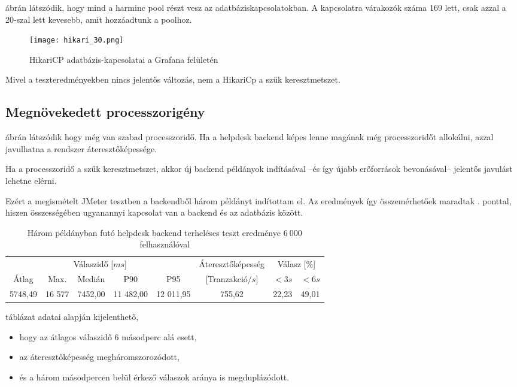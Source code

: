  ábrán látszódik, hogy mind a harminc pool részt vesz az adatbáziskapcsolatokban. A kapcsolatra várakozók száma 169 lett, csak azzal a 20-szal lett kevesebb, amit hozzáadtunk a poolhoz.


\begin{figure}[hbt] 
	\centering
	\texttt{[image: hikari\_30.png]}
	\caption{HikariCP adatbázis-kapcsolatai a Grafana felületén}
	\label{fig:hikari_30}
\end{figure}

Mivel a teszteredményekben nincs jelentős változás, nem a HikariCp a szűk keresztmetszet.

\pagebreak
\subsection{Megnövekedett processzorigény}
 ábrán látszódik hogy még van szabad processzoridő. Ha a helpdesk backend  képes lenne magának még processzoridőt allokálni, azzal javulhatna a rendszer áteresztőképessége. 

Ha a processzoridő a szűk keresztmetszet, akkor új backend példányok indításával --és így újabb erőforrások bevonásával-- jelentős javulást lehetne elérni.

Ezért a megismételt JMeter tesztben a backendből három példányt indítottam el. Az eredmények így összemérhetőek maradtak . ponttal, hiszen összességében ugyanannyi kapcsolat van a backend és az adatbázis között.


\begin{table}[hbt]
	
		\begin{tabular}{ccccc|c|cc}
			\multicolumn{5}{c|}{Válaszidő [$ms$]}  & Áteresztőképesség & \multicolumn{2}{c}{Válasz [\%]}	\\
			Átlag & Max. & Medián & P90 & P95 &	[Tranzakció$/s$] & $<3s$& $<6s$ \\
			\hline 
			5748,49 & 16 577 & 7452,00 & 11 482,00 & 12 011,95 & 755,62 & 22,23 & 49,01 \\
		\end{tabular} 
	
	\caption{Három példányban futó helpdesk backend terheléses teszt eredménye $6~000$ felhasználóval}
	\label{tabl:3_instance}
\end{table}


 táblázat adatai alapján kijelenthető,
\begin{itemize}
	\item hogy az átlagos válaszidő 6 másodperc alá esett,
	\item az áteresztőképesség megháromszorozódott,
	\item és a három másodpercen belül érkező válaszok aránya is megduplázódott.
\end{itemize}


